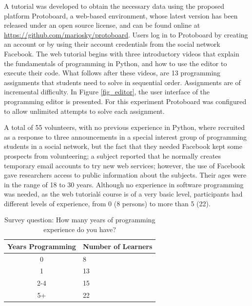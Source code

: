 \documentclass[a4paper,twoside]{article}
\begin{document}
A tutorial was developed to
obtain the necessary data using the proposed platform Protoboard, a web-based environment,
whose latest version has been released under an open source license,
and can be found online at \url{https://github.com/mariosky/protoboard}.
Users log in to
Protoboard  by creating an account or by using their account credentials from the
social network Facebook. The web tutorial begins with three introductory videos that explain
the fundamentals of programming in Python, and how to use the editor to
execute their code. What follows after these videos, are 13 programming
assignments that students need to solve in sequential order. Assignments are of
incremental difficulty.
In Figure \ref{fig_editor},
the user interface of the programming editor is
presented.
For this experiment Protoboard was configured to allow unlimited
attempts to solve each assignment.

A total of 55 volunteers, with no previous experience in Python, where recruited
as a response to three announcements in a special interest group of programming
students in a social network, but the fact that they needed Facebook kept some prospects from
volunteering; a subject reported that he normally creates temporary email
accounts to try new web services; however, the use of Facebook gave researchers access to public
information about the subjects. Their ages were in the range of 18 to
30 years. Although no experience in software programming was needed, as the
web tutorial\'s course is of a very basic level, participants had
different levels of experience, from 0 (8 persons) to more than 5 (22).

\begin{table}[!t]
\centering
\caption{ Survey question: How many years of programming experience do you have? }
\label{tab_results}
    \begin{tabular}{ | c | l | }
    \hline
    Years Programming          & Number of Learners \\
    \hline
   		0   &  8 \\
    \hline
    	1   &  13\\
    \hline
    	2-4  & 15\\
    \hline
    	5+   & 22\\
    \hline
    \end{tabular}

\end{table}
\end{document}
